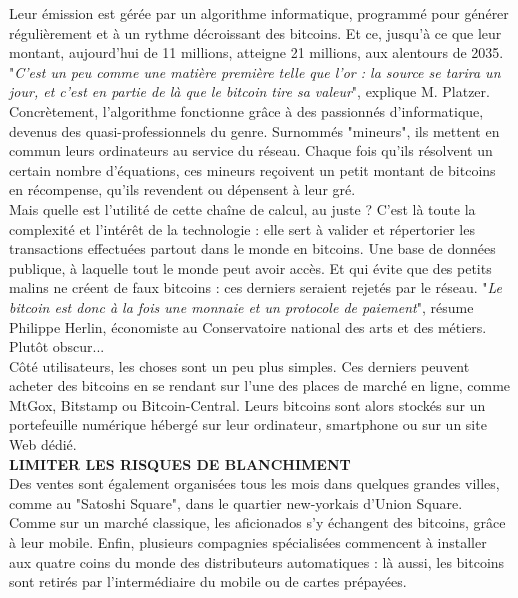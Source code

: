 \documentclass[11pt,twoside,a4paper]{article}
\begin{document}
Leur {\'e}mission est g{\'e}r{\'e}e par un algorithme informatique, programm{\'e} pour g{\'e}n{\'e}rer r{\'e}guli{\`e}rement et {\`a} un rythme d{\'e}croissant des bitcoins. Et ce, jusqu'{\`a} ce que leur montant, aujourd'hui de 11 millions, atteigne 21 millions, aux alentours de 2035. "\emph{C'est un peu comme une mati{\`e}re premi{\`e}re telle que l'or : la source se tarira un jour, et c'est en partie de l{\`a} que le bitcoin tire sa valeur}", explique M. Platzer. ~\\

Concr{\`e}tement, l'algorithme fonctionne gr{\^a}ce {\`a} des passionn{\'e}s d'informatique, devenus des quasi-professionnels du genre. Surnomm{\'e}s "mineurs", ils mettent en commun leurs ordinateurs au service du r{\'e}seau. Chaque fois qu'ils r{\'e}solvent un certain nombre d'{\'e}quations, ces mineurs re\c{c}oivent un petit montant de bitcoins en r{\'e}compense, qu'ils revendent ou d{\'e}pensent {\`a} leur gr{\'e}. ~\\

Mais quelle est l'utilit{\'e} de cette cha{\^i}ne de calcul, au juste ? C'est l{\`a} toute la complexit{\'e} et l'int{\'e}r{\^e}t de la technologie : elle sert {\`a} valider et r{\'e}pertorier les transactions effectu{\'e}es partout dans le monde en bitcoins. Une base de donn{\'e}es publique, {\`a} laquelle tout le monde peut avoir acc{\`e}s. Et qui {\'e}vite que des petits malins ne cr{\'e}ent de faux bitcoins : ces derniers seraient rejet{\'e}s par le r{\'e}seau. "\emph{Le bitcoin est donc {\`a} la fois une monnaie et un protocole de paiement}", r{\'e}sume Philippe Herlin, {\'e}conomiste au Conservatoire national des arts et des m{\'e}tiers. Plut{\^o}t obscur... ~\\

C{\^o}t{\'e} utilisateurs, les choses sont un peu plus simples. Ces derniers peuvent acheter des bitcoins en se rendant sur l'une des places de march{\'e} en ligne, comme MtGox, Bitstamp ou Bitcoin-Central. Leurs bitcoins sont alors stock{\'e}s sur un portefeuille num{\'e}rique h{\'e}berg{\'e} sur leur ordinateur, smartphone ou sur un site Web d{\'e}di{\'e}. ~\\

\textbf{LIMITER LES RISQUES DE BLANCHIMENT} ~\\

Des ventes sont {\'e}galement organis{\'e}es tous les mois dans quelques grandes villes, comme au "Satoshi Square", dans le quartier new-yorkais d'Union Square. Comme sur un march{\'e} classique, les aficionados s'y {\'e}changent des bitcoins, gr{\^a}ce {\`a} leur mobile. Enfin, plusieurs compagnies sp{\'e}cialis{\'e}es commencent {\`a} installer aux quatre coins du monde des distributeurs automatiques : l{\`a} aussi, les bitcoins sont retir{\'e}s par l'interm{\'e}diaire du mobile ou de cartes pr{\'e}pay{\'e}es. ~\\
\end{document}
